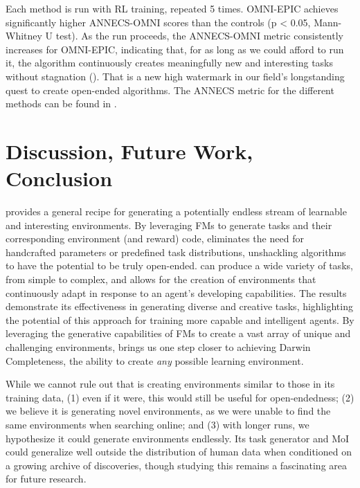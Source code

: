 \documentclass{article} %
\begin{document}
Each method is run with RL training, repeated 5 times. OMNI-EPIC achieves significantly higher ANNECS-OMNI scores than the controls (p < 0.05, Mann-Whitney U test). As the run proceeds, the ANNECS-OMNI metric consistently increases for OMNI-EPIC, indicating that, for as long as we could afford to run it, the algorithm continuously creates meaningfully new and interesting tasks without stagnation (). That is a new high watermark in our field’s longstanding quest to create open-ended algorithms. The ANNECS metric for the different methods can be found in .

\vspace{-7pt}
\section{Discussion, Future Work, Conclusion}
\label{sec:conclusion}
\vspace{-7pt}
%
\ours{} provides a general recipe for generating a potentially endless stream of learnable and interesting environments. By leveraging FMs to generate tasks and their corresponding environment (and reward) code, \ours{} eliminates the need for handcrafted parameters or predefined task distributions, unshackling algorithms to have the potential to be truly open-ended. \ours{} can produce a wide variety of tasks, from simple to complex, and allows for the creation of environments that continuously adapt in response to an agent's developing capabilities. The results demonstrate its effectiveness in generating diverse and creative tasks, highlighting the potential of this approach for training more capable and intelligent agents. By leveraging the generative capabilities of FMs to create a vast array of unique and challenging environments, \ours{} brings us one step closer to achieving Darwin Completeness, the ability to create \emph{any} possible learning environment.

While we cannot rule out that \ours{} is creating environments similar to those in its training data, (1) even if it were, this would still be useful for open-endedness; (2) we believe it is generating novel environments, as we were unable to find the same environments when searching online; and (3) with longer runs, we hypothesize it could generate environments endlessly. Its task generator and MoI could generalize well outside the distribution of human data when conditioned on a growing archive of discoveries, though studying this remains a fascinating area for future research.
\end{document}
